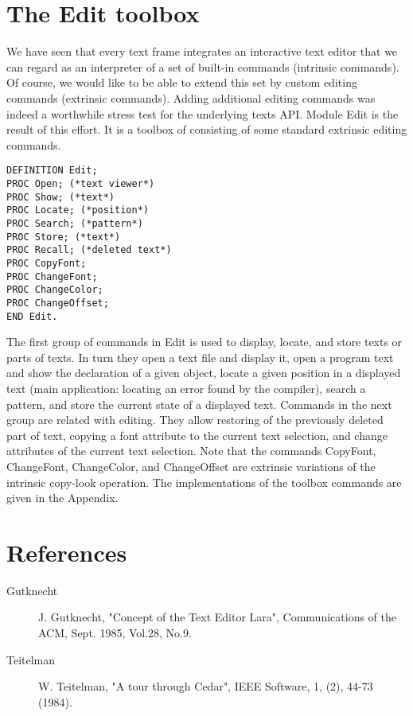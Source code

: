\section{The Edit toolbox}
We have seen that every text frame integrates an interactive text editor that we can regard as an
interpreter of a set of built-in commands (intrinsic commands). Of course, we would like to be able
to extend this set by custom editing commands (extrinsic commands). Adding additional editing
commands was indeed a worthwhile stress test for the underlying texts API. Module Edit is the
result of this effort. It is a toolbox of consisting of some standard extrinsic editing commands.
\begin{verbatim}
DEFINITION Edit;
PROC Open; (*text viewer*)
PROC Show; (*text*)
PROC Locate; (*position*)
PROC Search; (*pattern*)
PROC Store; (*text*)
PROC Recall; (*deleted text*)
PROC CopyFont;
PROC ChangeFont;
PROC ChangeColor;
PROC ChangeOffset;
END Edit.
\end{verbatim}

The first group of commands in Edit is used to display, locate, and store texts or parts of texts. In
turn they open a text file and display it, open a program text and show the declaration of a given
object, locate a given position in a displayed text (main application: locating an error found by the
compiler), search a pattern, and store the current state of a displayed text. Commands in the next
group are related with editing. They allow restoring of the previously deleted part of text, copying a
font attribute to the current text selection, and change attributes of the current text selection. Note
that the commands CopyFont, ChangeFont, ChangeColor, and ChangeOffset are extrinsic
variations of the intrinsic copy-look operation. The implementations of the toolbox commands are
given in the Appendix.

\section*{References}
\begin{description}
  \item[Gutknecht] J. Gutknecht, "Concept of the Text Editor Lara", Communications of the ACM, Sept. 1985, Vol.28, No.9.
  \item[Teitelman] W. Teitelman, "A tour through Cedar", IEEE Software, 1, (2), 44-73 (1984).
\end{description}


